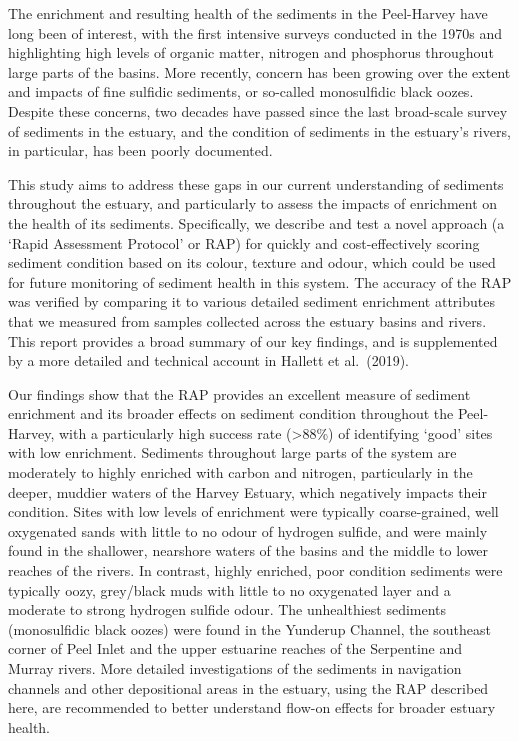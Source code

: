 \documentclass[
]{book}
\begin{document}
The enrichment and resulting health of the sediments in the Peel-Harvey have long been of interest, with the first intensive surveys conducted in the 1970s and highlighting high levels of organic matter, nitrogen and phosphorus throughout large parts of the basins. More recently, concern has been growing over the extent and impacts of fine sulfidic sediments, or so-called monosulfidic black oozes. Despite these concerns, two decades have passed since the last broad-scale survey of sediments in the estuary, and the condition of sediments in the estuary's rivers, in particular, has been poorly documented.

This study aims to address these gaps in our current understanding of sediments throughout the estuary, and particularly to assess the impacts of enrichment on the health of its sediments. Specifically, we describe and test a novel approach (a `Rapid Assessment Protocol' or RAP) for quickly and cost-effectively scoring sediment condition based on its colour, texture and odour, which could be used for future monitoring of sediment health in this system. The accuracy of the RAP was verified by comparing it to various detailed sediment enrichment attributes that we measured from samples collected across the estuary basins and rivers. This report provides a broad summary of our key findings, and is supplemented by a more detailed and technical account in Hallett et al.~(2019).

Our findings show that the RAP provides an excellent measure of sediment enrichment and its broader effects on sediment condition throughout the Peel-Harvey, with a particularly high success rate (\textgreater88\%) of identifying `good' sites with low enrichment. Sediments throughout large parts of the system are moderately to highly enriched with carbon and nitrogen, particularly in the deeper, muddier waters of the Harvey Estuary, which negatively impacts their condition. Sites with low levels of enrichment were typically coarse-grained, well oxygenated sands with little to no odour of hydrogen sulfide, and were mainly found in the shallower, nearshore waters of the basins and the middle to lower reaches of the rivers. In contrast, highly enriched, poor condition sediments were typically oozy, grey/black muds with little to no oxygenated layer and a moderate to strong hydrogen sulfide odour. The unhealthiest sediments (monosulfidic black oozes) were found in the Yunderup Channel, the southeast corner of Peel Inlet and the upper estuarine reaches of the Serpentine and Murray rivers. More detailed investigations of the sediments in navigation channels and other depositional areas in the estuary, using the RAP described here, are recommended to better understand flow-on effects for broader estuary health.
\end{document}

